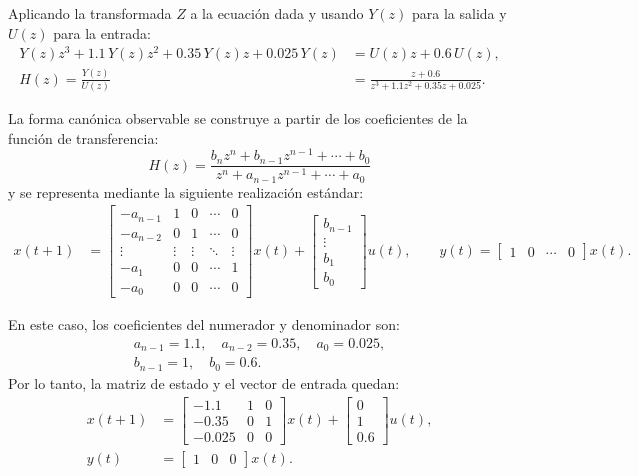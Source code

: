 \documentclass[
  11pt,
  letterpaper,
   addpoints,
  answers
  ]{exam}
\begin{document}
\begin{questions}
\begin{solution}
Aplicando la transformada $Z$ a la ecuación dada y usando $Y(z)$ para la salida y $U(z)$ para la entrada:
\begin{align}
Y(z)z^{3} + 1.1\, Y(z)z^{2} + 0.35\, Y(z)z + 0.025\, Y(z) &= U(z)z + 0.6\, U(z), \\
H(z) = \frac{Y(z)}{U(z)} &= \frac{z + 0.6}{z^{3} + 1.1 z^{2} + 0.35 z + 0.025}.
\end{align}

La forma canónica observable se construye a partir de los coeficientes de la función de transferencia:
\begin{equation}
H(z) = \frac{b_n z^n + b_{n-1} z^{n-1} + \cdots + b_0}{z^n + a_{n-1} z^{n-1} + \cdots + a_0}
\end{equation}
y se representa mediante la siguiente realización estándar:
\begin{align}
x(t+1) &=
\begin{bmatrix}
-a_{n-1} & 1 & 0 & \cdots & 0 \\
-a_{n-2} & 0 & 1 & \cdots & 0 \\
\vdots & \vdots & \vdots & \ddots & \vdots \\
-a_1 & 0 & 0 & \cdots & 1 \\
-a_0 & 0 & 0 & \cdots & 0
\end{bmatrix} x(t)
+ \begin{bmatrix}
b_{n-1} \\
\vdots \\
b_1 \\
b_0
\end{bmatrix} u(t), \qquad
y(t) = \begin{bmatrix}1 & 0 & \cdots & 0\end{bmatrix} x(t).
\end{align}

En este caso, los coeficientes del numerador y denominador son:
\begin{align*}
a_{n-1} = 1.1, \quad a_{n-2} = 0.35, \quad a_0 = 0.025, \\
b_{n-1} = 1, \quad b_0 = 0.6.
\end{align*}
Por lo tanto, la matriz de estado y el vector de entrada quedan:
\begin{align}
x(t+1) &=
\begin{bmatrix}
-1.1 & 1 & 0 \\
-0.35 & 0 & 1 \\
-0.025 & 0 & 0
\end{bmatrix} x(t) +
\begin{bmatrix}
0 \\
1 \\
0.6
\end{bmatrix} u(t), \label{eq:obs-realization}\\
y(t) &= \begin{bmatrix}1 & 0 & 0\end{bmatrix} x(t).
\end{align}


\end{solution}
\end{questions}
\end{document}

